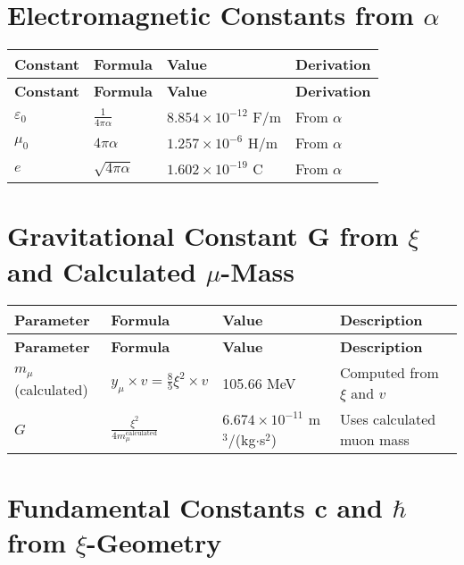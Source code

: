 \documentclass[12pt,a4paper]{article}
\begin{document}
	\section{Electromagnetic Constants from \(\alpha\)}
	
	\begin{longtable}{|p{3cm}|p{4cm}|p{4cm}|p{3cm}|}
		\hline
		\textbf{Constant} & \textbf{Formula} & \textbf{Value} & \textbf{Derivation} \\
		\hline
		\endfirsthead
		\hline
		\textbf{Constant} & \textbf{Formula} & \textbf{Value} & \textbf{Derivation} \\
		\hline
		\endhead
		\(\varepsilon_0\) & \(\frac{1}{4\pi\alpha}\) & \(8.854 \times 10^{-12}\) F/m & From \(\alpha\) \\
		\hline
		\(\mu_0\) & \(4\pi\alpha\) & \(1.257 \times 10^{-6}\) H/m & From \(\alpha\) \\
		\hline
		\(e\) & \(\sqrt{4\pi\alpha}\) & \(1.602 \times 10^{-19}\) C & From \(\alpha\) \\
		\hline
	\end{longtable}
	
	\section{Gravitational Constant G from \(\xi\) and Calculated \(\mu\)-Mass}
	
	\begin{longtable}{|p{3cm}|p{5cm}|p{4cm}|p{3cm}|}
		\hline
		\textbf{Parameter} & \textbf{Formula} & \textbf{Value} & \textbf{Description} \\
		\hline
		\endfirsthead
		\hline
		\textbf{Parameter} & \textbf{Formula} & \textbf{Value} & \textbf{Description} \\
		\hline
		\endhead
		\(m_{\mu}\) (calculated) & \(y_{\mu} \times v = \frac{8}{5}\xi^{2} \times v\) & 105.66 MeV & Computed from \(\xi\) and \(v\) \\
		\hline
		\(G\) & \(\frac{\xi^{2}}{4m_{\mu}^{\text{calculated}}}\) & \(6.674 \times 10^{-11}\) m\(^3\)/(kg\(\cdot\)s\(^2\)) & Uses calculated muon mass \\
		\hline
	\end{longtable}
	
	\section{Fundamental Constants c and \(\hbar\) from \(\xi\)-Geometry}
	
\end{document}
